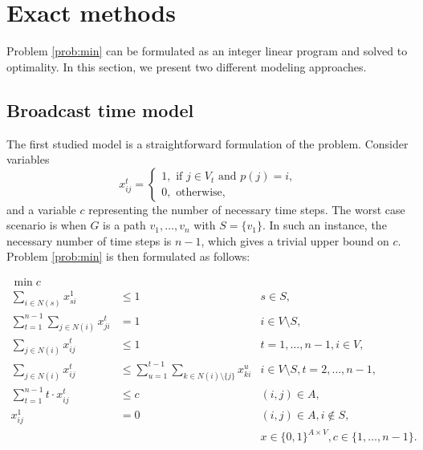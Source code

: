\section{Exact methods}

Problem \ref{prob:min} can be formulated as an integer linear program and solved to optimality. In this section, we present two different modeling approaches. 

\subsection{Broadcast time model}
The first studied model is a straightforward formulation of the problem.
Consider variables 
$$ x_{ij}^t=
\begin{cases} 
1, \text{ if } j\in V_t \text{ and } p(j)=i,\\ 
0, \text{ otherwise},
\end{cases}
$$
and a variable $c$ representing the number of necessary time steps.
The worst case scenario is when $G$ is a path $v_1,\dots,v_n$ with $S=\{v_1\}$. 
In such an instance, the necessary number of time steps is $n-1$, which gives a trivial upper bound on $c$.
Problem \ref{prob:min} is then formulated as follows: 

\begin{subequations}\label{mod:basic}
\begin{align}
\label{mod:basic:obj} \min c \\ 
\label{mod:basic:onefromroot} \sum_{i \in N(s)}x^1_{si} & \leq 1 & s\in S,\\
\label{mod:basic:singlein} \sum\limits_{t=1}^{n-1}\sum\limits_{j\in N(i)}x_{ji}^t & = 1 & i\in V \setminus S,\\
\label{mod:basic:uniqueTout} \sum\limits_{j\in N(i)}x_{ij}^t & \leq 1  & t=1,\dots,n-1,i\in V,\\
\label{mod:basic:tIncreases} \sum\limits_{j\in N(i)}x_{ij}^t &\leq\sum\limits_{u=1}^{t-1}\sum\limits_{k\in N(i)\setminus\{j\}} x_{ki}^u  & i\in V\setminus S, t=2,\dots,n-1,\\
\label{mod:basic:tcrel} \sum\limits_{t=1}^{n-1}t\cdot x_{ij}^t & \leq c &  (i,j)\in A,\\
\label{mod:basic:positiveCost}x_{ij}^1 & = 0 & (i,j)\in A, i \not\in S,\\
\label{mod:basic:dim}&&x \in \{0,1\}^{A\times V}, c \in\{1,\dots,n-1\}.
\end{align}~
\end{subequations}

